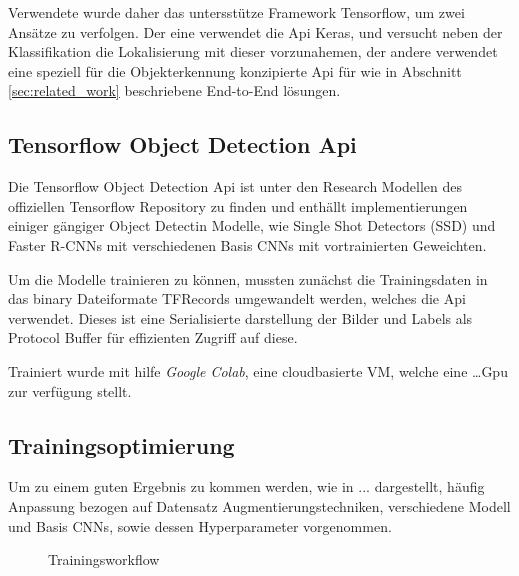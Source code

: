Verwendete wurde daher das untersstütze Framework Tensorflow, 
um zwei Ansätze zu verfolgen. Der eine verwendet die Api Keras, 
und versucht neben der Klassifikation die Lokalisierung mit 
dieser vorzunahemen, der andere verwendet eine speziell für die 
Objekterkennung konzipierte Api für wie in Abschnitt
 \ref{sec:related_work} beschriebene End-to-End lösungen.

\subsection{Tensorflow Object Detection Api}

Die Tensorflow Object Detection Api ist unter den Research Modellen
\cite{HttpsGithubCom} des offiziellen Tensorflow Repository zu
finden und enthällt implementierungen einiger gängiger Object Detectin
Modelle, wie Single Shot Detectors (SSD) und Faster R-CNNs mit 
verschiedenen Basis CNNs mit vortrainierten Geweichten.

Um die Modelle trainieren zu können, mussten zunächst die 
Trainingsdaten in das binary Dateiformate TFRecords umgewandelt 
werden, welches die Api verwendet. Dieses ist eine Serialisierte 
darstellung der Bilder und Labels als Protocol Buffer für
effizienten Zugriff auf diese.

Trainiert wurde mit hilfe \textit{Google Colab}, eine cloudbasierte VM,
welche eine \dots Gpu zur verfügung stellt.

\subsection{Trainingsoptimierung}

Um zu einem guten Ergebnis zu kommen werden, wie in ... dargestellt, 
häufig Anpassung bezogen auf Datensatz Augmentierungstechniken, 
verschiedene Modell und Basis CNNs, sowie dessen Hyperparameter vorgenommen.

\begin{figure}[htb]
    \centering
    \def\svgwidth{0.7\textwidth}
    
    \caption{Trainingsworkflow}
    \label{fig:train_workflow}
\end{figure}

